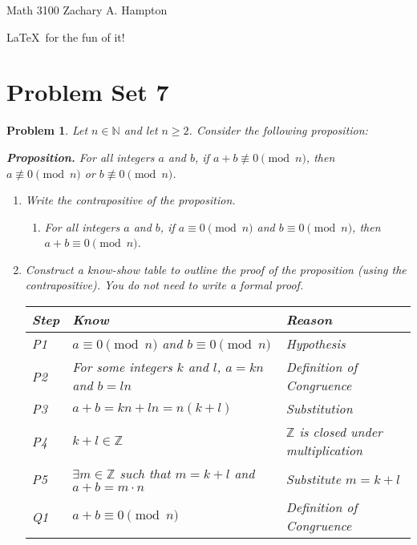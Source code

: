 \documentclass[12pt]{article}
\newtheorem{problem}{Problem} %
\theoremstyle{definition}
\begin{document}
Math 3100 \hfill Zachary A. Hampton

\LaTeX~for the fun of it! \hfill 
{}

\bigskip

\section*{Problem Set 7}

\begin{problem}
Let \( n \in \mathbb{N} \) and let \( n \geq 2 \). Consider the following proposition:

\textbf{Proposition.} For all integers \( a \) and \( b \), if \( a + b \not\equiv 0 \pmod{n} \), then \( a \not\equiv 0 \pmod{n} \) or \( b \not\equiv 0 \pmod{n} \).

\begin{enumerate}[label=(\alph*)]
    \item Write the contrapositive of the proposition.
    \begin{enumerate}[label=(\alph*)]
        \item For all integers \( a \) and \( b \), if \( a \equiv 0 \pmod{n} \) and \( b \equiv 0 \pmod{n} \), then \( a + b \equiv 0 \pmod{n} \).
    
    \end{enumerate}
    
    \item Construct a know-show table to outline the proof of the proposition (using the contrapositive). You do not need to write a formal proof.

    \begin{center}
        \begin{tabular}{|p{}|p{}|p{}|}
        \hline
        \textbf{Step} & \textbf{Know} & \textbf{Reason} \\
        \hline
            P1 & \( a \equiv 0 \pmod{n} \) and \( b \equiv 0 \pmod{n} \) & Hypothesis \\
        \hline
            P2 & For some integers \( k \) and \( l \), \( a = kn \) and \( b = ln \) & Definition of Congruence \\
        \hline
            P3 & \( a + b = kn + ln = n(k + l) \) & Substitution \\
        \hline
            P4 & \( k + l \in \mathbb{Z} \) & \( \mathbb{Z} \) is closed under multiplication \\
        \hline
            P5 & \( \exists m \in \mathbb{Z} \) such that \( m = k + l \) and \( a + b = m \cdot n \) & Substitute \( m = k + l \) \\
        \hline
            Q1 & \( a + b \equiv 0 \pmod{n} \) & Definition of Congruence \\
        \hline
    \end{tabular}
\end{center}
    
\end{enumerate}
\end{problem}
\end{document}
